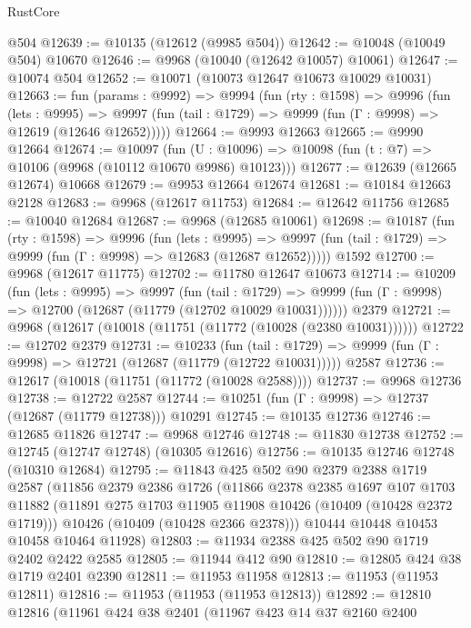 \begin{lexlean}{RustCore}
\begin{coremodule}
    @504
@12639 := @10135 (@12612 (@9985 @504))
@12642 := @10048 (@10049 @504) @10670
@12646 := @9968 (@10040 (@12642 @10057) @10061)
@12647 := @10074 @504
@12652 := @10071 (@10073 @12647 @10673 @10029 @10031)
@12663 := fun (params : @9992) =>
  @9994
    (fun (rty : @1598) =>
    @9996
      (fun (lets : @9995) =>
      @9997 (fun (tail : @1729) => @9999 (fun (Γ : @9998) => @12619 (@12646 @12652)))))
@12664 := @9993 @12663
@12665 := @9990 @12664
@12674 := @10097
    (fun (U : @10096) => @10098 (fun (t : @7) => @10106 (@9968 (@10112 @10670 @9986) @10123)))
@12677 := @12639 (@12665 @12674) @10668
@12679 := @9953 @12664 @12674
@12681 := @10184 @12663 @2128
@12683 := @9968 (@12617 @11753)
@12684 := @12642 @11756
@12685 := @10040 @12684
@12687 := @9968 (@12685 @10061)
@12698 := @10187
    (fun (rty : @1598) =>
    @9996
      (fun (lets : @9995) =>
      @9997 (fun (tail : @1729) => @9999 (fun (Γ : @9998) => @12683 (@12687 @12652)))))
    @1592
@12700 := @9968 (@12617 @11775)
@12702 := @11780 @12647 @10673
@12714 := @10209
    (fun (lets : @9995) =>
    @9997
      (fun (tail : @1729) =>
      @9999 (fun (Γ : @9998) => @12700 (@12687 (@11779 (@12702 @10029 @10031))))))
    @2379
@12721 := @9968 (@12617 (@10018 (@11751 (@11772 (@10028 (@2380 @10031))))))
@12722 := @12702 @2379
@12731 := @10233
    (fun (tail : @1729) => @9999 (fun (Γ : @9998) => @12721 (@12687 (@11779 (@12722 @10031)))))
    @2587
@12736 := @12617 (@10018 (@11751 (@11772 (@10028 @2588))))
@12737 := @9968 @12736
@12738 := @12722 @2587
@12744 := @10251 (fun (Γ : @9998) => @12737 (@12687 (@11779 @12738))) @10291
@12745 := @10135 @12736
@12746 := @12685 @11826
@12747 := @9968 @12746
@12748 := @11830 @12738
@12752 := @12745 (@12747 @12748) (@10305 @12616)
@12756 := @10135 @12746 @12748 (@10310 @12684)
@12795 := @11843
    @425
    @502
    @90
    @2379
    @2388
    @1719
    @2587
    (@11856
      @2379
      @2386
      @1726
      (@11866
        @2378
        @2385
        @1697
        @107
        @1703
        @11882
        (@11891 @275 @1703 @11905 @11908 @10426 (@10409 (@10428 @2372 @1719)))
        @10426
        (@10409 (@10428 @2366 @2378)))
      @10444
      @10448
      @10453
      @10458
      @10464
      @11928)
@12803 := @11934 @2388 @425 @502 @90 @1719 @2402 @2422 @2585
@12805 := @11944 @412 @90
@12810 := @12805 @424 @38 @1719 @2401 @2390
@12811 := @11953 @11958
@12813 := @11953 (@11953 @12811)
@12816 := @11953 (@11953 (@11953 @12813))
@12892 := @12810
    @12816
    (@11961
      @424
      @38
      @2401
      (@11967
        @423
        @14
        @37
        @2160
        @2400

\end{coremodule}
\end{lexlean}
